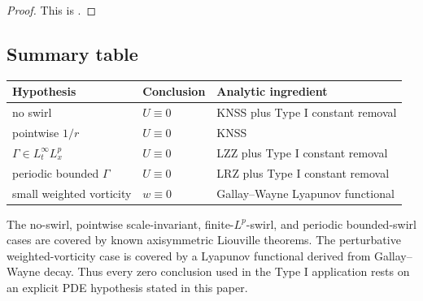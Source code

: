 \documentclass[11pt]{amsart}
\theoremstyle{plain}
\theoremstyle{definition}
\theoremstyle{remark}
\numberwithin{equation}{section}
\begin{document}
\begin{proof}
This is .
\end{proof}

\subsection{Summary table}

\begin{center}
\begin{tabular}{p{}p{}p{}}
\hline
Hypothesis & Conclusion & Analytic ingredient \\
\hline
no swirl & \(U\equiv0\) & KNSS plus Type I constant removal \\
pointwise \(1/r\) & \(U\equiv0\) & KNSS \\
\(\Gamma\in L_t^\infty L_x^p\) & \(U\equiv0\) & LZZ plus Type I constant removal \\
periodic bounded \(\Gamma\) & \(U\equiv0\) & LRZ plus Type I constant removal \\
small weighted vorticity & \(w\equiv0\) & Gallay--Wayne Lyapunov functional \\
\hline
\end{tabular}
\end{center}

The no-swirl, pointwise scale-invariant, finite-\(L^p\)-swirl, and periodic
bounded-swirl cases are covered by known axisymmetric Liouville theorems.  The
perturbative weighted-vorticity case is covered by a Lyapunov functional
derived from Gallay--Wayne decay.
Thus every zero conclusion used in the Type I application rests on an explicit
PDE hypothesis stated in this paper.
\end{document}
